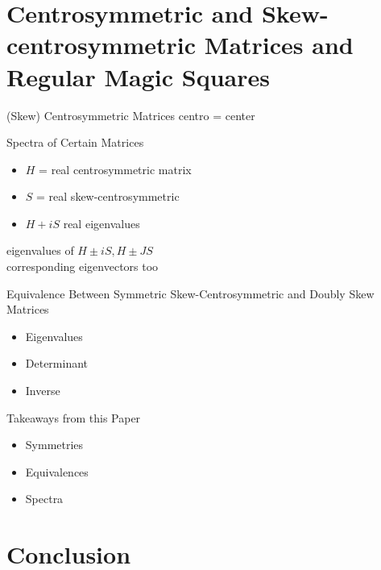 \documentclass[10pt]{beamer}
\begin{document}
\section{Centrosymmetric and Skew-centrosymmetric Matrices and Regular Magic Squares}
\begin{frame}{(Skew) Centrosymmetric Matrices}
    centro = center
\end{frame}

\begin{frame}{Spectra of Certain Matrices}
    \begin{itemize}
        \item $H$ = real centrosymmetric matrix
        \item $S$ = real skew-centrosymmetric
        \item $H+iS$ real eigenvalues
    \end{itemize}
    eigenvalues of $H\pm iS, H\pm JS$
    \\
    corresponding eigenvectors too
\end{frame}

\begin{frame}{Equivalence Between Symmetric Skew-Centrosymmetric and Doubly Skew Matrices}
    \begin{itemize}
        \item Eigenvalues
        \item Determinant
        \item Inverse
    \end{itemize}
\end{frame}

\begin{frame}{Takeaways from this Paper}
    \begin{itemize}
        \item Symmetries
        \item Equivalences
        \item Spectra
    \end{itemize}
\end{frame}

\section{Conclusion}




\end{document}
